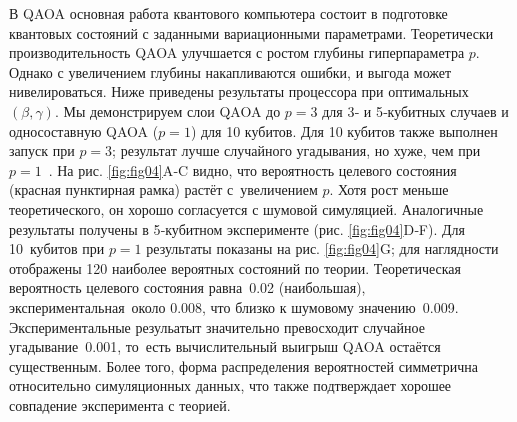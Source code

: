 В QAOA основная работа квантового компьютера состоит в подготовке квантовых
состояний с заданными вариационными параметрами. Теоретически
производительность QAOA улучшается с ростом глубины гиперпараметра $p$. Однако
с увеличением глубины накапливаются ошибки, и выгода может нивелироваться. Ниже
приведены результаты процессора при оптимальных $(\beta,\gamma)$. Мы
демонстрируем слои QAOA до $p=3$ для 3‑ и 5‑кубитных случаев и односоставную
QAOA ($p=1$) для 10 кубитов. Для 10 кубитов также выполнен запуск при $p=3$;
результат лучше случайного угадывания, но хуже, чем при $p=1$ \cite{cite_31}.
На рис. \ref{fig:fig04}A‑C видно, что вероятность целевого состояния (красная
пунктирная рамка) растёт с увеличением $p$. Хотя рост меньше теоретического, он
хорошо согласуется с шумовой симуляцией. Аналогичные результаты получены в
5‑кубитном эксперименте (рис. \ref{fig:fig04}D‑F). Для 10 кубитов при $p=1$
результаты показаны на рис. \ref{fig:fig04}G; для наглядности отображены 120
наиболее вероятных состояний по теории. Теоретическая вероятность целевого
состояния равна 0.02 (наибольшая), экспериментальная около 0.008, что близко к
шумовому значению 0.009. Экспериментальные резульатыт значительно превосходит
случайное угадывание 0.001, то есть вычислительный выигрыш QAOA остаётся
существенным. Более того, форма распределения вероятностей симметрична
относительно симуляционных данных, что также подтверждает хорошее совпадение
эксперимента с теорией.


